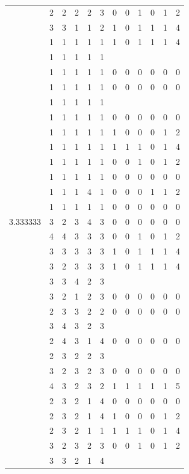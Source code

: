 \documentclass[]{book}
\theoremstyle{definition}
\theoremstyle{definition}
\theoremstyle{definition}
\theoremstyle{remark}
\begin{document}
\begin{table}
{\begin{tabular}[t]{rrrrrrrrrrrr}
 & 2 & 2 & 2 & 2 & 3 & 0 & 0 & 1 & 0 & 1 & 2\\
 & 3 & 3 & 1 & 1 & 2 & 1 & 0 & 1 & 1 & 1 & 4\\
 & 1 & 1 & 1 & 1 & 1 & 1 & 0 & 1 & 1 & 1 & 4\\
 & 1 & 1 & 1 & 1 & 1 &  &  &  &  &  & \\
 & 1 & 1 & 1 & 1 & 1 & 0 & 0 & 0 & 0 & 0 & 0\\
 & 1 & 1 & 1 & 1 & 1 & 0 & 0 & 0 & 0 & 0 & 0\\
 & 1 & 1 & 1 & 1 & 1 &  &  &  &  &  & \\
 & 1 & 1 & 1 & 1 & 1 & 0 & 0 & 0 & 0 & 0 & 0\\
 & 1 & 1 & 1 & 1 & 1 & 1 & 0 & 0 & 0 & 1 & 2\\
 & 1 & 1 & 1 & 1 & 1 & 1 & 1 & 1 & 0 & 1 & 4\\
 & 1 & 1 & 1 & 1 & 1 & 0 & 0 & 1 & 0 & 1 & 2\\
 & 1 & 1 & 1 & 1 & 1 & 0 & 0 & 0 & 0 & 0 & 0\\
 & 1 & 1 & 1 & 4 & 1 & 0 & 0 & 0 & 1 & 1 & 2\\
 & 1 & 1 & 1 & 1 & 1 & 0 & 0 & 0 & 0 & 0 & 0\\
3.333333 & 3 & 2 & 3 & 4 & 3 & 0 & 0 & 0 & 0 & 0 & 0\\
 & 4 & 4 & 3 & 3 & 3 & 0 & 0 & 1 & 0 & 1 & 2\\
 & 3 & 3 & 3 & 3 & 3 & 1 & 0 & 1 & 1 & 1 & 4\\
 & 3 & 2 & 3 & 3 & 3 & 1 & 0 & 1 & 1 & 1 & 4\\
 & 3 & 3 & 4 & 2 & 3 &  &  &  &  &  & \\
 & 3 & 2 & 1 & 2 & 3 & 0 & 0 & 0 & 0 & 0 & 0\\
 & 2 & 3 & 3 & 2 & 2 & 0 & 0 & 0 & 0 & 0 & 0\\
 & 3 & 4 & 3 & 2 & 3 &  &  &  &  &  & \\
 & 2 & 4 & 3 & 1 & 4 & 0 & 0 & 0 & 0 & 0 & 0\\
 & 2 & 3 & 2 & 2 & 3 &  &  &  &  &  & \\
 & 3 & 2 & 3 & 2 & 3 & 0 & 0 & 0 & 0 & 0 & 0\\
 & 4 & 3 & 2 & 3 & 2 & 1 & 1 & 1 & 1 & 1 & 5\\
 & 2 & 3 & 2 & 1 & 4 & 0 & 0 & 0 & 0 & 0 & 0\\
 & 2 & 3 & 2 & 1 & 4 & 1 & 0 & 0 & 0 & 1 & 2\\
 & 2 & 3 & 2 & 1 & 1 & 1 & 1 & 1 & 0 & 1 & 4\\
 & 3 & 2 & 3 & 2 & 3 & 0 & 0 & 1 & 0 & 1 & 2\\
 & 3 & 3 & 2 & 1 & 4 &  &  &  &  &  & \\

\end{tabular}}
\end{table}
\end{document}
